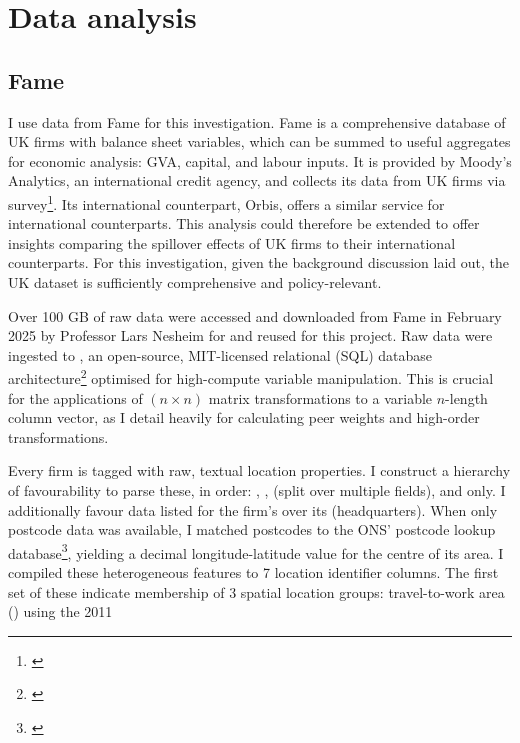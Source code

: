 \section{Data analysis}
\label{s:data}

\subsection{Fame}

I use data from Fame for this investigation.
Fame is a comprehensive database of UK firms with  balance sheet variables,
which can be summed to useful aggregates
for economic analysis: GVA, capital, and labour inputs.
It is provided by Moody's Analytics, an international credit agency,
and collects its data from UK firms via survey\footnote{\cite{MoodysAnalytics2026}}.
Its international counterpart, Orbis, offers a similar service for international counterparts.
This analysis could therefore be extended to offer insights comparing the spillover effects
of UK firms to their international counterparts.
For this investigation, given the background discussion laid out,
the UK dataset is sufficiently comprehensive and policy-relevant.
\par
Over 100 GB of raw data were accessed and downloaded from Fame in February 2025
by Professor Lars Nesheim for \cite{Irastorza-Fadrique2026} and reused for this project.
Raw data were ingested to , an open-source, MIT-licensed relational (SQL)
database architecture\footnote{\cite{Raasveldt2026}} optimised for high-compute variable manipulation.
This is crucial for the applications of $(n\times n)$ matrix transformations
to a variable $n$-length column vector, as I detail heavily for calculating peer weights
and high-order transformations.
\par
Every firm is tagged with raw, textual location properties.
I construct a hierarchy of favourability to parse these, in order:
, ,  (split over multiple fields),
and  only.
I additionally favour data listed for the firm's 
over its  (headquarters).
When only postcode data was available, I matched postcodes
to the ONS' postcode lookup database\footnote{\cite{ons2025:nspl}},
yielding a decimal longitude-latitude value for the centre of its area.
I compiled these heterogeneous features to 7 location identifier columns.
The first set of these indicate membership of 3 spatial location groups:
travel-to-work area () using the 2011
